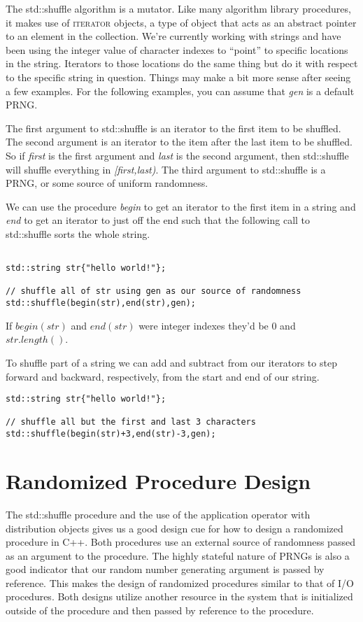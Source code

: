 \documentclass[]{tufte-handout}
\begin{document}
The std::shuffle algorithm is a mutator.  Like many algorithm library procedures, it makes use of \textsc{iterator} objects, a type of object that acts as an abstract pointer to an element in the collection. We're currently working with strings and have been using the integer value of character indexes to ``point'' to specific locations in the string. Iterators to those locations do the same thing but do it with respect to the specific string in question. Things may make a bit more sense after seeing a few examples. For the following examples, you can assume that \textit{gen} is a default PRNG.

The first argument to std::shuffle is an iterator to the first item to be shuffled. The second argument is an iterator to the item after the last item to be shuffled. So if \textit{first} is the first argument and \textit{last} is the second argument, then std::shuffle will shuffle everything in \textit{[first,last)}. The third argument to std::shuffle is a PRNG, or some source of uniform randomness.

We can use the procedure \textit{begin} to get an iterator to the first item in a string and \textit{end} to get an iterator to just off the end such that the following call to std::shuffle sorts the whole string.
\begin{verbatim}

std::string str{"hello world!"};

// shuffle all of str using gen as our source of randomness	
std::shuffle(begin(str),end(str),gen);
\end{verbatim}
If $begin(str)$ and $end(str)$ were integer indexes they'd be $0$ and $str.length()$.


To shuffle part of a string we can add and subtract from our iterators to step forward and backward, respectively, from the start and end of our string.  
\begin{verbatim}
std::string str{"hello world!"};

// shuffle all but the first and last 3 characters
std::shuffle(begin(str)+3,end(str)-3,gen);
\end{verbatim}

\section{Randomized Procedure Design}

The std::shuffle procedure and the use of the application operator with distribution objects gives us a good design cue for how to design a randomized procedure in C++. Both procedures use an external source of randomness passed as an argument to the procedure. The highly stateful nature of PRNGs is also a good indicator that our random number generating argument is passed by reference. This makes the design of randomized procedures similar to that of I/O procedures. Both designs utilize another resource in the system that is initialized outside of the procedure and then passed by reference to the procedure. 
\end{document}
